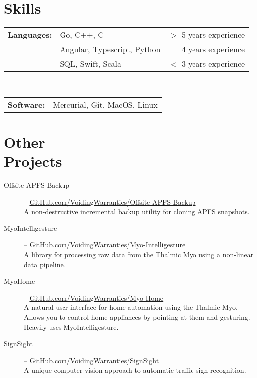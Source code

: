 \documentclass[margin]{res}
\begin{document}
\begin{minipage}{\textwidth}
\begin{resume}
\section{Skills}
\begin{tabular}{l l r}
		{\bf Languages:} & Go, C++, C & $>$ 5 years experience \\
		                 & Angular, Typescript, Python & 4 years experience \\
		                 & SQL, Swift, Scala & $<$ 3 years experience \\
\end{tabular} \\
\bgroup
\def\arraystretch{1.23} %
\begin{tabular}{l p{4in}}
		{\bf Software:} & Mercurial, Git, MacOS, Linux \\
 \end{tabular}
\egroup

\section{Other \\ Projects}
\begin{description}
	\item[Offsite APFS Backup] -- \uline{\href{https://GitHub.com/VoidingWarranties/offsite-apfs-backup}{GitHub.com/VoidingWarranties/Offsite-APFS-Backup}} \\
		A non-destructive incremental backup utility for cloning APFS snapshots.
	\item[MyoIntelligesture] -- \uline{\href{http://GitHub.com/VoidingWarranties/Myo-Intelligesture}{GitHub.com/VoidingWarranties/Myo-Intelligesture}} \\
		A library for processing raw data from the Thalmic Myo using a non-linear data pipeline.
	\item[MyoHome] -- \uline{\href{http://GitHub.com/VoidingWarranties/Myo-Home}{GitHub.com/VoidingWarranties/Myo-Home}} \\
		A natural user interface for home automation using the Thalmic Myo. Allows you to control home appliances by pointing at them and gesturing. Heavily uses MyoIntelligesture.
	\item[SignSight] -- \uline{\href{http://GitHub.com/VoidingWarranties/SignSight}{GitHub.com/VoidingWarranties/SignSight}} \\
		A unique computer vision approach to automatic traffic sign recognition.
\end{description}


\end{resume}
\end{minipage}
\end{document}
